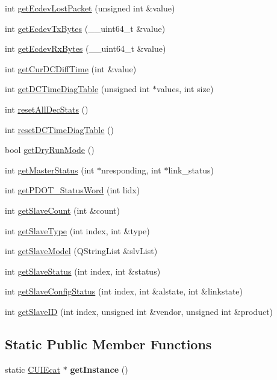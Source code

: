 \begin{DoxyCompactItemize}
int \hyperlink{classCUIEcat_a22955872bac93e2cad78bcd3f92f7950}{get\-Ecdev\-Lost\-Packet} (unsigned int \&value)
\item 
int \hyperlink{classCUIEcat_a54cba199d61add01ac1a3e8d9556ee69}{get\-Ecdev\-Tx\-Bytes} (\-\_\-\-\_\-uint64\-\_\-t \&value)
\item 
int \hyperlink{classCUIEcat_abbfab5b1cfa7865b62d65568e8d7717d}{get\-Ecdev\-Rx\-Bytes} (\-\_\-\-\_\-uint64\-\_\-t \&value)
\item 
int \hyperlink{classCUIEcat_ab8f415bfde5990a430b9c914728c704a}{get\-Cur\-D\-C\-Diff\-Time} (int \&value)
\item 
int \hyperlink{classCUIEcat_aa3925bea5f3005eb3148258af76bbb56}{get\-D\-C\-Time\-Diag\-Table} (unsigned int $\ast$values, int size)
\item 
int \hyperlink{classCUIEcat_a8f374b27b638738365452c3af355f985}{reset\-All\-Dec\-Stats} ()
\item 
int \hyperlink{classCUIEcat_a6161809b8f173a498d84b88dd73a7c69}{reset\-D\-C\-Time\-Diag\-Table} ()
\item 
bool \hyperlink{classCUIEcat_ad3735a860c41fd65b46391cccc06797f}{get\-Dry\-Run\-Mode} ()
\item 
int \hyperlink{classCUIEcat_aa747cfc7b2ad2a3fb8331aa954ca5fa7}{get\-Master\-Status} (int $\ast$nresponding, int $\ast$link\-\_\-status)
\item 
int \hyperlink{classCUIEcat_a0c938af16ecdceaedc0ad19291d30412}{get\-P\-D\-O\-T\-\_\-\-Status\-Word} (int lidx)
\item 
int \hyperlink{classCUIEcat_ab8d3d89cb7f2423c7169e394f8249093}{get\-Slave\-Count} (int \&count)
\item 
int \hyperlink{classCUIEcat_aa76e7a892399d346d2b1cd62df405680}{get\-Slave\-Type} (int index, int \&type)
\item 
int \hyperlink{classCUIEcat_a2f5f74641c1a1e53211148ad9d553625}{get\-Slave\-Model} (Q\-String\-List \&slv\-List)
\item 
int \hyperlink{classCUIEcat_a274705f2b3039015250d7a9905b656ca}{get\-Slave\-Status} (int index, int \&status)
\item 
int \hyperlink{classCUIEcat_a40efffb366ee16bd654f049f99ffcf90}{get\-Slave\-Config\-Status} (int index, int \&alstate, int \&linkstate)
\item 
int \hyperlink{classCUIEcat_a8d4f878e23b62931681cfddce5e8e797}{get\-Slave\-I\-D} (int index, unsigned int \&vendor, unsigned int \&product)
\end{DoxyCompactItemize}
\subsection*{Static Public Member Functions}
\begin{DoxyCompactItemize}
\item 
\hypertarget{classCUIEcat_a903ce71f0d20c4cb74d96cecdb51ae88}{static \hyperlink{classCUIEcat}{C\-U\-I\-Ecat} $\ast$ {\bfseries get\-Instance} ()}\label{classCUIEcat_a903ce71f0d20c4cb74d96cecdb51ae88}

\end{DoxyCompactItemize}


